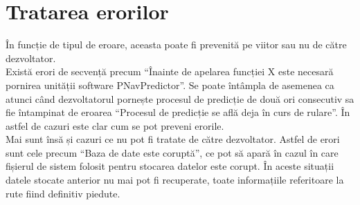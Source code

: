 	
\section{Tratarea erorilor}
În funcție de tipul de eroare, aceasta poate fi prevenită pe viitor sau nu de către dezvoltator.
\vspace{6pt}
\\Există erori de secvență precum ``Înainte de apelarea funcției X este necesară pornirea unității software PNavPredictor''. Se poate întâmpla de asemenea ca atunci când dezvoltatorul pornește procesul de predicție de două ori consecutiv sa fie întampinat de eroarea ``Procesul de predicție se află deja în curs de rulare''.
În astfel de cazuri este clar cum se pot preveni erorile.
\vspace{6pt}
\\Mai sunt însă și cazuri ce nu pot fi tratate de către dezvoltator. Astfel de erori sunt cele precum ``Baza de date este coruptă'', ce pot să apară în cazul în care fișierul de sistem folosit pentru stocarea datelor este corupt. În aceste situații datele stocate anterior nu mai pot fi recuperate, toate informațiile referitoare la rute fiind definitiv piedute.



